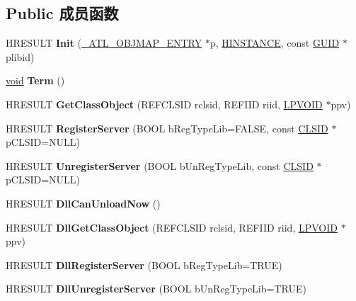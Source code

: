\subsection*{Public 成员函数}
\begin{DoxyCompactItemize}
\item 
\mbox{\label{class_a_t_l_1_1_c_com_module_a88dd01ac51cbdad33fd91205247f791b}} 
H\+R\+E\+S\+U\+LT {\bfseries Init} (\hyperlink{struct_a_t_l_1_1___a_t_l___o_b_j_m_a_p___e_n_t_r_y30}{\+\_\+\+A\+T\+L\+\_\+\+O\+B\+J\+M\+A\+P\+\_\+\+E\+N\+T\+RY} $\ast$p, \hyperlink{interfacevoid}{H\+I\+N\+S\+T\+A\+N\+CE}, const \hyperlink{interface_g_u_i_d}{G\+U\+ID} $\ast$plibid)
\item 
\mbox{\label{class_a_t_l_1_1_c_com_module_a11f1326e7a7c031418e0ff1c3707c0e3}} 
\hyperlink{interfacevoid}{void} {\bfseries Term} ()
\item 
\mbox{\label{class_a_t_l_1_1_c_com_module_afda1e7bf0a3d0c197aee564f6cfa7204}} 
H\+R\+E\+S\+U\+LT {\bfseries Get\+Class\+Object} (R\+E\+F\+C\+L\+S\+ID rclsid, R\+E\+F\+I\+ID riid, \hyperlink{interfacevoid}{L\+P\+V\+O\+ID} $\ast$ppv)
\item 
\mbox{\label{class_a_t_l_1_1_c_com_module_a6f104d4345358c0f5a8394ec7dca3f70}} 
H\+R\+E\+S\+U\+LT {\bfseries Register\+Server} (B\+O\+OL b\+Reg\+Type\+Lib=F\+A\+L\+SE, const \hyperlink{struct___i_i_d}{C\+L\+S\+ID} $\ast$p\+C\+L\+S\+ID=N\+U\+LL)
\item 
\mbox{\label{class_a_t_l_1_1_c_com_module_af5d46ea1c3b54ee7992380bd9636af92}} 
H\+R\+E\+S\+U\+LT {\bfseries Unregister\+Server} (B\+O\+OL b\+Un\+Reg\+Type\+Lib, const \hyperlink{struct___i_i_d}{C\+L\+S\+ID} $\ast$p\+C\+L\+S\+ID=N\+U\+LL)
\item 
\mbox{\label{class_a_t_l_1_1_c_com_module_a971c44bdade632bf947ccd9259066751}} 
H\+R\+E\+S\+U\+LT {\bfseries Dll\+Can\+Unload\+Now} ()
\item 
\mbox{\label{class_a_t_l_1_1_c_com_module_a373c6a1aa9909f1df69307c525b6f95f}} 
H\+R\+E\+S\+U\+LT {\bfseries Dll\+Get\+Class\+Object} (R\+E\+F\+C\+L\+S\+ID rclsid, R\+E\+F\+I\+ID riid, \hyperlink{interfacevoid}{L\+P\+V\+O\+ID} $\ast$ppv)
\item 
\mbox{\label{class_a_t_l_1_1_c_com_module_aa97f7c79cc42aa77d0f8f3c144ab3249}} 
H\+R\+E\+S\+U\+LT {\bfseries Dll\+Register\+Server} (B\+O\+OL b\+Reg\+Type\+Lib=T\+R\+UE)
\item 
\mbox{\label{class_a_t_l_1_1_c_com_module_a728597717a94afa98d25f7db8312d0c0}} 
H\+R\+E\+S\+U\+LT {\bfseries Dll\+Unregister\+Server} (B\+O\+OL b\+Un\+Reg\+Type\+Lib=T\+R\+UE)
\end{DoxyCompactItemize}
